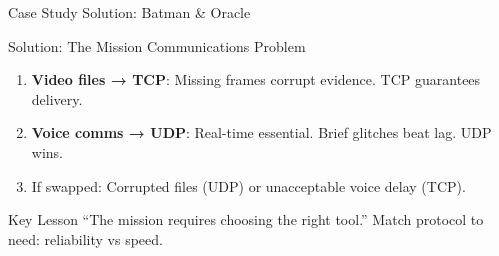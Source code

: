\documentclass[aspectratio=169, 11pt]{beamer}
\newcommand{\iconlaptop}[1][0.6cm]{\resizebox{#1}{!}{\faLaptop}}
\newcommand{\iconserver}[1][0.6cm]{\resizebox{#1}{!}{\faServer}}
\newenvironment{casesolution}[1]{%
    \begin{exampleblock}{Solution: #1}
}{\end{exampleblock}}
\begin{document}
\begin{frame}{Case Study Solution: Batman \& Oracle}
    \begin{casesolution}{The Mission Communications Problem}
        \small
        \begin{enumerate}\setlength{\itemsep}{1pt}
            \item \textbf{Video files → TCP}: Missing frames corrupt evidence. TCP guarantees delivery.
            \item \textbf{Voice comms → UDP}: Real-time essential. Brief glitches beat lag. UDP wins.
            \item If swapped: Corrupted files (UDP) or unacceptable voice delay (TCP).
        \end{enumerate}
    \end{casesolution}
    
    \begin{center}
    \end{center}
    
    \begin{alertblock}{Key Lesson}
        \small
        ``The mission requires choosing the right tool.'' Match protocol to need: reliability vs speed.
    \end{alertblock}
\end{frame}
\end{document}
